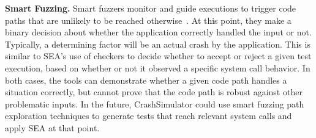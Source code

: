 {\bf Smart Fuzzing.}
Smart fuzzers monitor and guide executions to
trigger code paths that are unlikely to be reached
otherwise~\cite{smartfuzzing, taintbasedfuzzing}.
At this point, they make a binary decision about
whether the application correctly handled the input or not.
Typically, a determining factor will be an actual crash by the application.
This is similar to SEA's use of checkers to decide whether
to accept or reject a given test
execution, based on whether or not it observed a specific system call behavior.
In both cases, the tools can demonstrate whether a given code path handles a
situation correctly, but cannot prove that the code path is robust against
other problematic inputs.  In the future, CrashSimulator could use smart
fuzzing path exploration techniques to generate tests that reach relevant
system calls and apply SEA at that point.

%

